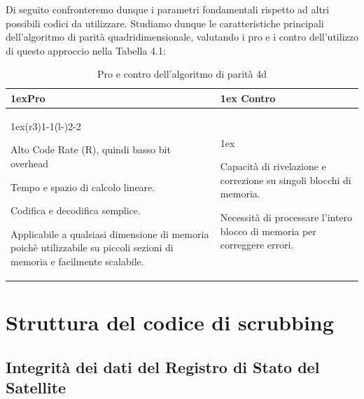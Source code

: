 \documentclass[LaM,binding=0.6cm,oneside]{../sapthesis}
\begin{document}
Di seguito confronteremo dunque i parametri fondamentali rispetto ad altri possibili codici da utilizzare.
Studiamo dunque le caratteristiche principali dell'algoritmo di parità quadridimensionale, valutando i pro e i contro dell'utilizzo di questo approccio nella Tabella 4.1:



\begin{table}
\begin{tabularx}{\linewidth}{>{\parskip1ex}X@{\kern4\tabcolsep}>{\parskip1ex}X}
\toprule
\hfil\bfseries Pro
&
\hfil\bfseries Contro
\\\cmidrule(r{3\tabcolsep}){1-1}\cmidrule(l{-\tabcolsep}){2-2}


     Alto Code Rate (R), quindi basso bit overhead\par
    
     Tempo e spazio di calcolo lineare.\par
    
    Codifica e decodifica semplice.\par
    
    Applicabile a qualsiasi dimensione di memoria poichè utilizzabile su piccoli sezioni
    di memoria e facilmente scalabile.\par


&

Capacità di rivelazione e correzione su singoli blocchi di memoria.\par

Necessità di processare l'intero blocco di memoria per correggere errori.\par


\\\bottomrule
\end{tabularx}
\caption{Pro e contro dell'algoritmo di parità 4d}
\end{table}

\clearpage

\section{Struttura del codice di scrubbing}


\subsection{Integrità dei dati del Registro di Stato del Satellite}
\end{document}

